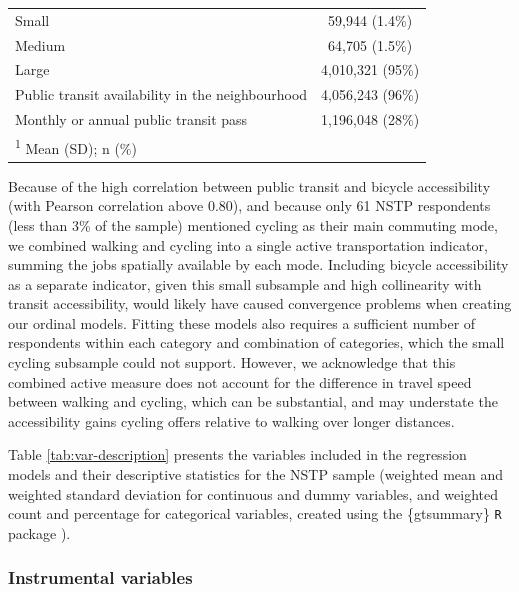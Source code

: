 \documentclass[preprint, 3p,
authoryear]{elsarticle} %
\begin{document}
\begin{table}
\begin{tabular}[t]{lc}
\hspace{1em}Small & 59,944 (1.4\%)\\
\hspace{1em}Medium & 64,705 (1.5\%)\\
\hspace{1em}Large & 4,010,321 (95\%)\\
\addlinespace
Public transit availability in the neighbourhood & 4,056,243 (96\%)\\
Monthly or annual public transit pass & 1,196,048 (28\%)\\
\bottomrule
\multicolumn{2}{l}{\rule{0pt}{1em}\textsuperscript{1} Mean (SD); n (\%)}\\
\end{tabular}
\end{table}

Because of the high correlation between public transit and bicycle
accessibility (with Pearson correlation above 0.80), and because only 61
NSTP respondents (less than 3\% of the sample) mentioned cycling as
their main commuting mode, we combined walking and cycling into a single
active transportation indicator, summing the jobs spatially available by
each mode. Including bicycle accessibility as a separate indicator,
given this small subsample and high collinearity with transit
accessibility, would likely have caused convergence problems when
creating our ordinal models. Fitting these models also requires a
sufficient number of respondents within each category and combination of
categories, which the small cycling subsample could not support.
However, we acknowledge that this combined active measure does not
account for the difference in travel speed between walking and cycling,
which can be substantial, and may understate the accessibility gains
cycling offers relative to walking over longer distances.

Table \ref{tab:var-description} presents the variables included in the
regression models and their descriptive statistics for the NSTP sample
(weighted mean and weighted standard deviation for continuous and dummy
variables, and weighted count and percentage for categorical variables,
created using the \{gtsummary\} \texttt{R} package \citep{gtsummary}).

\subsubsection{Instrumental variables}\label{instrumental-variables}
\end{document}
